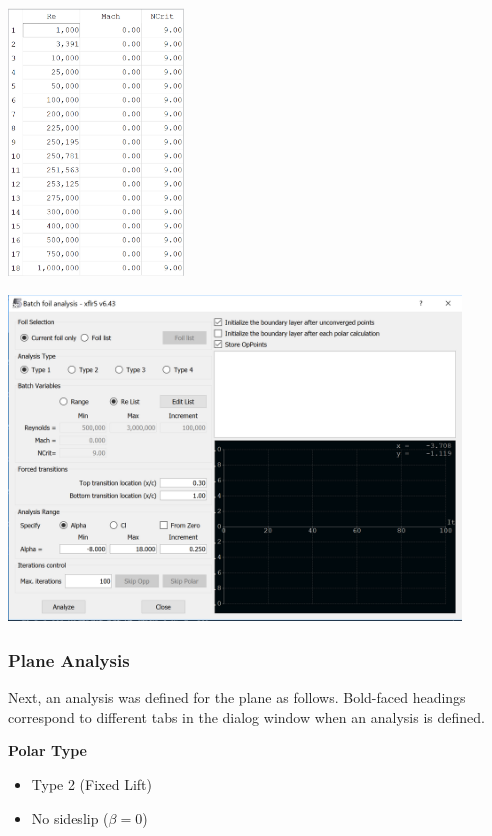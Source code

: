 \documentclass[]{auvsi_doc}
\begin{document}
\begin{center}
	\includegraphics[width=0.35\textwidth]{./figs/airfoilAnalysisTable.png}
	\label{relist}
\end{center}

\begin{center}
	\includegraphics[width=0.9\textwidth]{./figs/airfoilAnalysisSettings.png}
	\label{settings}
\end{center}

\subsubsection{Plane Analysis}
Next, an analysis was defined for the plane as follows. Bold-faced headings correspond to different tabs in the dialog window when an analysis is defined.

\textbf{Polar Type}
\begin{itemize}
	\item Type 2 (Fixed Lift)
	\item No sideslip ($\beta=0$)
\end{itemize}
\end{document}
